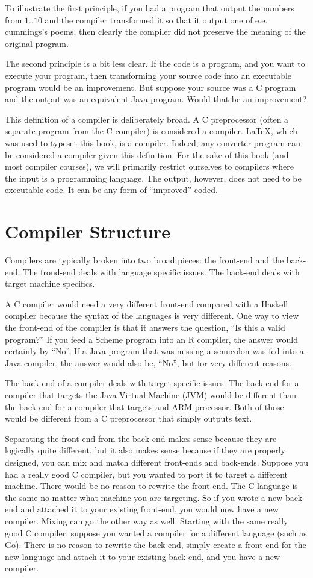 \documentclass[letterpaper,12pt,openany,reqno]{book}%
\begin{document}
To illustrate the first principle, if you had a program that output the numbers from $1..10$ and the compiler transformed it so that it output one of e.e. cummings's poems, then clearly the compiler did not preserve the meaning of the original program.

The second principle is a bit less clear. If the code is a program, and you want to execute your program, then transforming your source code into an executable program would be an improvement. But suppose your source was a C program and the output was an equivalent Java program. Would that be an improvement?

This definition of a compiler is deliberately broad. A C preprocessor (often a separate program from the C compiler) is considered a compiler. \LaTeX, which was used to typeset this book, is a compiler. Indeed, any converter program can be considered a compiler given this definition. For the sake of this book (and most compiler courses), we will primarily restrict ourselves to compilers where the input is a programming language. The output, however, does not need to be executable code. It can be any form of ``improved'' coded.

\chapter{Compiler Structure}
Compilers are typically broken into two broad pieces: the front-end and the back-end. The frond-end deals with language specific issues. The back-end deals with target machine specifics.

A C compiler would need a very different front-end compared with a Haskell compiler because the syntax of the languages is very different. One way to view the front-end of the compiler is that it answers the question, ``Is this a valid program?'' If you feed a Scheme program into an R compiler, the answer would certainly by ``No''. If a Java program that was missing a semicolon was fed into a Java compiler, the answer would also be, ``No'', but for very different reasons.

The back-end of a compiler deals with target specific issues. The back-end for a compiler that targets the Java Virtual Machine (JVM) would be different than the back-end for a compiler that targets and ARM processor. Both of those would be different from a C preprocessor that simply outputs text.

Separating the front-end from the back-end makes sense because they are logically quite different, but it also makes sense because if they are properly designed, you can mix and match different front-ends and back-ends. Suppose you had a really good C compiler, but you wanted to port it to target a different machine. There would be no reason to rewrite the front-end. The C language is the same no matter what machine you are targeting. So if you wrote a new back-end and attached it to your existing front-end, you would now have a new compiler. Mixing can go the other way as well. Starting with the same really good C compiler, suppose you wanted a compiler for a different language (such as Go). There is no reason to rewrite the back-end, simply create a front-end for the new language and attach it to your existing back-end, and you have a new compiler.
\end{document}
